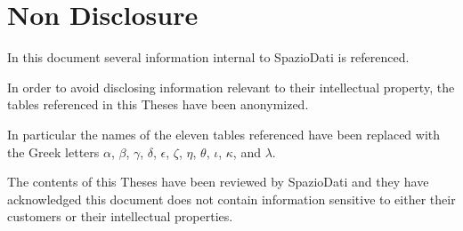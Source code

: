 \chapter{Non Disclosure}
\label{ch:non-disclosure}

In this document several information internal to SpazioDati is referenced.

In order to avoid disclosing information relevant to their intellectual property, the tables referenced in this Theses have been anonymized.

In particular the names of the eleven tables referenced have been replaced with the Greek letters $\alpha$, $\beta$, $\gamma$, $\delta$, $\epsilon$, $\zeta$, $\eta$, $\theta$, $\iota$, $\kappa$, and $\lambda$.


The contents of this Theses have been reviewed by SpazioDati and they have acknowledged this document does not contain information sensitive to either their customers or their intellectual properties.
